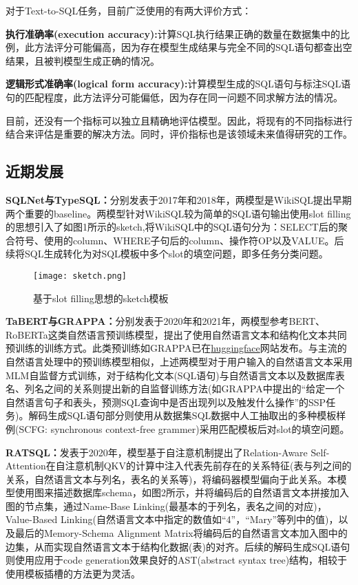 \documentclass[lang=cn,a4paper,newtx]{elegantpaper}
\begin{document}
    对于Text-to-SQL任务，目前广泛使用的有两大评价方式：
    
    \textbf{执行准确率(execution accuracy):}计算SQL执行结果正确的数量在数据集中的比例，此方法评分可能偏高，因为存在模型生成结果与完全不同的SQL语句都查出空结果，且被判模型生成正确的情况。

    \textbf{逻辑形式准确率(logical form accuracy):}计算模型生成的SQL语句与标注SQL语句的匹配程度，此方法评分可能偏低，因为存在同一问题不同求解方法的情况。

    目前，还没有一个指标可以独立且精确地评估模型。因此，将现有的不同指标进行结合来评估是重要的解决方法。同时，评价指标也是该领域未来值得研究的工作。

    \subsection{近期发展}
        \textbf{SQLNet\cite{7}与TypeSQL\cite{8}：}分别发表于2017年和2018年，两模型是WikiSQL提出早期两个重要的baseline。两模型针对WikiSQL较为简单的SQL语句输出使用slot filling的思想引入了如图1所示的sketch,将WikiSQL中的SQL语句分为：SELECT后的聚合符号、使用的column、WHERE子句后的column、操作符OP以及VALUE。后续将SQL生成转化为对SQL模板中多个slot的填空问题，即多任务分类问题。

        \begin{figure}[h]
            \centering
            \texttt{[image: sketch.png]}
            \caption{基于slot filling思想的sketch模板}
        \end{figure}
        
        \textbf{TaBERT\cite{9}与GRAPPA\cite{10}：}分别发表于2020年和2021年，两模型参考BERT、RoBERTa这类自然语言预训练模型，提出了使用自然语言文本和结构化文本共同预训练的训练方式。此类预训练如GRAPPA已在\href{https://huggingface.co/Salesforce/grappa_large_jnt}{huggingface}网站发布。与主流的自然语言处理中的预训练模型相似，上述两模型对于用户输入的自然语言文本采用MLM自监督方式训练，对于结构化文本(SQL语句)与自然语言文本以及数据库表名、列名之间的关系则提出新的自监督训练方法(如GRAPPA中提出的“给定一个自然语言句子和表头，预测SQL查询中是否出现列以及触发什么操作”的SSP任务)。解码生成SQL语句部分则使用从数据集SQL数据中人工抽取出的多种模板样例(SCFG: synchronous context-free grammer)采用匹配模板后对slot的填空问题。

        \textbf{RATSQL\cite{11}：}发表于2020年，模型基于自注意机制提出了Relation-Aware Self-Attention在自注意机制QKV的计算中注入代表先前存在的关系特征(表与列之间的关系，自然语言文本与列名，表名的关系等)，将编码器模型偏向于此关系。本模型使用图来描述数据库schema，如图2所示，并将编码后的自然语言文本拼接加入图的节点集，通过Name-Base Linking(最基本的于列名，表名之间的对应)，Value-Based Linking(自然语言文本中指定的数值如“4”，“Mary”等列中的值)，以及最后的Memory-Schema Alignment Matrix将编码后的自然语言文本加入图中的边集，从而实现自然语言文本于结构化数据(表)的对齐。后续的解码生成SQL语句则使用应用于code generation效果良好的AST(abstract syntax tree)结构，相较于使用模板插槽的方法更为灵活。
\end{document}
